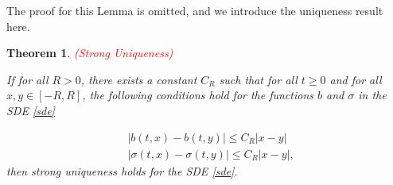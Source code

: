 \documentclass{article}
\newtheorem{theorem}{Theorem}
\begin{document}
The proof for this Lemma is omitted, and we introduce the uniqueness result here.

\begin{theorem} \label{thm:strong_uniqueness} \textcolor{red}{(Strong Uniqueness)}

If for all $R>0$, there exists a constant $C_R$ such that for all $t\geq0$ and for all $x,y\in[-R,R]$, the following conditions hold for the functions $b$ and $\sigma$ in the SDE \eqref{sde}

\begin{equation*}
\begin{aligned}
&|b(t,x)-b(t,y)|\leq C_R|x-y|\\
&|\sigma(t,x)-\sigma(t,y)|\leq C_R|x-y|,
\end{aligned}
\end{equation*}
then strong uniqueness holds for the SDE \eqref{sde}.

\end{theorem}
\end{document}
